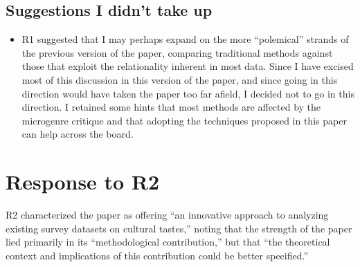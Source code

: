 \documentclass[a4paper,12pt]{extarticle}
\begin{document}
\subsection{Suggestions I didn't take up}
\begin{itemize}
    \item R1 suggested that I may perhaps expand on the more ``polemical'' strands of the previous version of the paper, comparing traditional methods against those that exploit the relationality inherent in most data. Since I have excised most of this discussion in this version of the paper, and since going in this direction would have taken the paper too far afield, I decided not to go in this direction. I retained some hints that most methods are affected by the microgenre critique and that adopting the techniques proposed in this paper can help across the board. 
\end{itemize}

\section{Response to R2}
R2 characterized the paper as offering ``an innovative approach to analyzing existing survey datasets on cultural tastes,'' noting that the strength of the paper lied primarily in its ``methodological contribution,'' but that ``the theoretical context and implications of this contribution could be better specified.''
\end{document}
